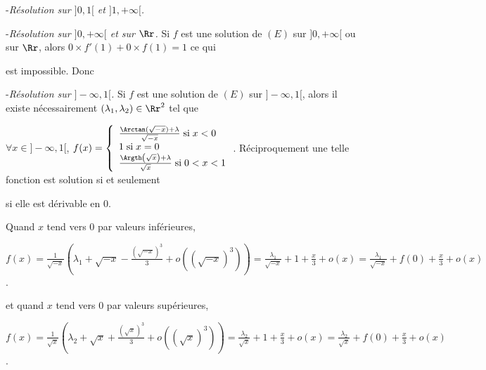 {\begin{enumerate}
{-\textit{Résolution sur $]0,1[$ et $]1,+\infty[$.}

\begin{center}
\fbox{
$\mathcal{S}_{]0,1[}=\left\{x\mapsto \frac{\Argth\left(\sqrt{x}\right)+\lambda}{\sqrt{x}},\;\lambda\in\Rr\right\}$ et $\mathcal{S}_{]1,+\infty[}=\left\{x\mapsto \frac{ \frac{1}{2}\ln\left(
  \frac{\sqrt{x}+1}{\sqrt{x}-1}\right)+\lambda}{\sqrt{x}},\;\lambda\in\Rr\right\}$.
}
\end{center}

-\textit{Résolution sur $]0,+\infty[$ et sur $\Rr$.} Si $f$ est une solution de $(E)$ sur $]0,+\infty[$ ou sur $\Rr$, alors $0\times f'(1)+0\times f(1)=1$ ce qui

est impossible. Donc

\begin{center}
\fbox{
$\mathcal{S}_{]0,+\infty[}=\varnothing$ et $\mathcal{S}_{\Rr}=\varnothing$.
}
\end{center}

-\textit{Résolution sur $]-\infty,1[$.} Si $f$ est une solution de $(E)$ sur $]-\infty,1[$, alors il existe nécessairement $(\lambda_1,\lambda_2)\in\Rr^2$ tel que

$\forall x\in]-\infty,1[$, $f(x)=\left\{
\begin{array}{l}
 \frac{\Arctan(\sqrt{-x})+\lambda}{\sqrt{-x}}\;\text{si}\;x<0\\
1\;\text{si}\;x=0\\
 \frac{\Argth\left(\sqrt{x}\right)+\lambda}{\sqrt{x}}\;\text{si}\;0<x<1
\end{array}
\right.$. Réciproquement une telle fonction est solution si et seulement

si elle est dérivable en $0$.

Quand $x$ tend vers $0$ par valeurs inférieures,

\begin{center}
$f(x)= \frac{1}{\sqrt{-x}}\left(\lambda_1+\sqrt{-x}- \frac{\left(\sqrt{-x}\right)^3}{3}+o\left((\sqrt{-x})^3\right)\right)= \frac{\lambda_1}{\sqrt{-x}}+1+ \frac{x}{3}+o(x)= \frac{\lambda_1}{\sqrt{-x}}+f(0)+ \frac{x}{3}+o(x)$.
\end{center}

et quand $x$ tend vers $0$ par valeurs supérieures,

\begin{center}
$f(x)= \frac{1}{\sqrt{x}}\left(\lambda_2+\sqrt{x}+ \frac{\left(\sqrt{x}\right)^3}{3}+o\left((\sqrt{x})^3\right)\right)= \frac{\lambda_2}{\sqrt{x}}+1+ \frac{x}{3}+o(x)= \frac{\lambda_2}{\sqrt{x}}+f(0)+ \frac{x}{3}+o(x)$.
\end{center}

}
\end{enumerate}}
